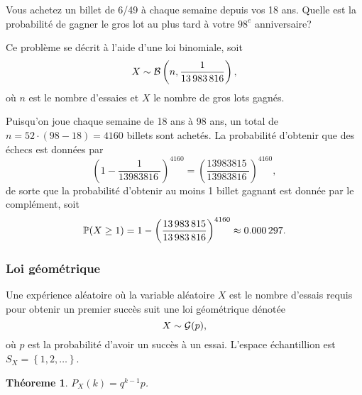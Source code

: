 \documentclass[11pt]{article}
\renewcommand\P{%
	\ensuremath{%
		\mathbb{P}%
	}%
}%
\newcommand\bin{%
	\ensuremath{%
		\mathcal{B}%
	}%
}%
\newcommand\geo{%
	\ensuremath{%
		\mathcal{G}%
	}%
}%
\newtheorem{theoreme}{Théoreme}[section]
\begin{document}
\vspace{-5mm}
\begin{exemple}
	Vous achetez un billet de 6/49 à chaque semaine depuis vos 18 ans. Quelle
	est la probabilité de gagner le gros lot au plus tard à votre $98^e$
	anniversaire?
	
	Ce problème se décrit à l'aide d'une loi binomiale, soit
	\begin{equation*}
		X\sim\bin\left(n,\frac{1}{\SI{13983816}{}}\right),
	\end{equation*}
	où $n$ est le nombre d'essaies et $X$ le nombre de gros lots gagnés.
	\vspace{-1mm}
\end{exemple}\pagebreak
\addtocounter{exemple}{-1}
\begin{exemple}[suite]
	Puisqu'on joue chaque semaine de 18 ans à 98 ans, un total de
	$n=52\cdot(98-18)=4160$ billets sont achetés. La probabilité d'obtenir que
	des échecs est données par
	\begin{equation*}
		\left(1-\frac{1}{\SI{13983816}{}}\right)^{4160}=
		\left(\frac{\SI{13983815}{}}{\SI{13983816}{}}\right)^{4160},
	\end{equation*}
	de sorte que la probabilité d'obtenir au moins 1 billet gagnant est donnée
	par le complément, soit
	\begin{equation*}
		\P(X\geq 1)
		=1-\left(\frac{\SI{13983815}{}}{\SI{13983816}{}}\right)^{4160}
		\approx\SI{0.000297}{}.
	\end{equation*}
\end{exemple}

\subsubsection{Loi géométrique}
Une expérience aléatoire où la variable aléatoire $X$ est le nombre d'essais
requis pour obtenir un premier succès suit une loi géométrique dénotée
\begin{equation*}
	X\sim\geo(p),
\end{equation*}
où $p$ est la probabilité d'avoir un succès à un essai. L'espace échantillion
est $S_X=\left\{1,2,\dots\right\}$.

\begin{theoreme}
	$P_X(k)=q^{k-1}p$.
\end{theoreme}
\end{document}
